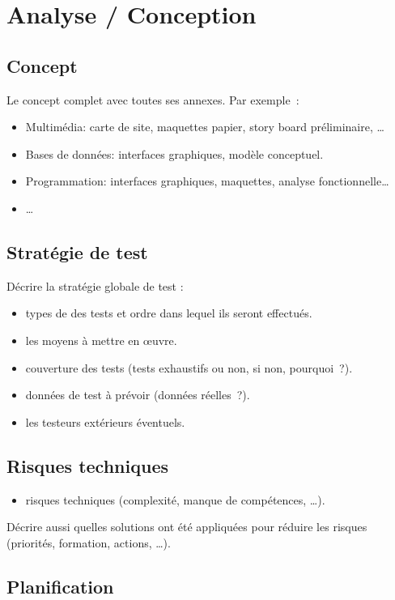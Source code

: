 \chapter{Analyse / Conception}
\section{Concept}

Le concept complet avec toutes ses annexes. Par exemple : 
\begin{itemize}
  \item Multimédia: carte de site, maquettes papier, story board préliminaire, …
  \item Bases de données: interfaces graphiques, modèle conceptuel.
  \item Programmation: interfaces graphiques, maquettes, analyse fonctionnelle…
  \item …
\end{itemize}

\section{Stratégie de test}

Décrire la stratégie globale de test :
\begin{itemize}
  \item types de des tests et ordre dans lequel ils seront effectués.
  \item les moyens à mettre en œuvre.
  \item couverture des tests (tests exhaustifs ou non, si non, pourquoi ?).
  \item données de test à prévoir (données réelles ?).
  \item les testeurs extérieurs éventuels.
\end{itemize}

\section{Risques techniques}
\begin{itemize}
  \item risques techniques (complexité, manque de compétences, …).
\end{itemize}
Décrire aussi quelles solutions ont été appliquées pour réduire les risques (priorités, formation, actions, …).

\section{Planification}

